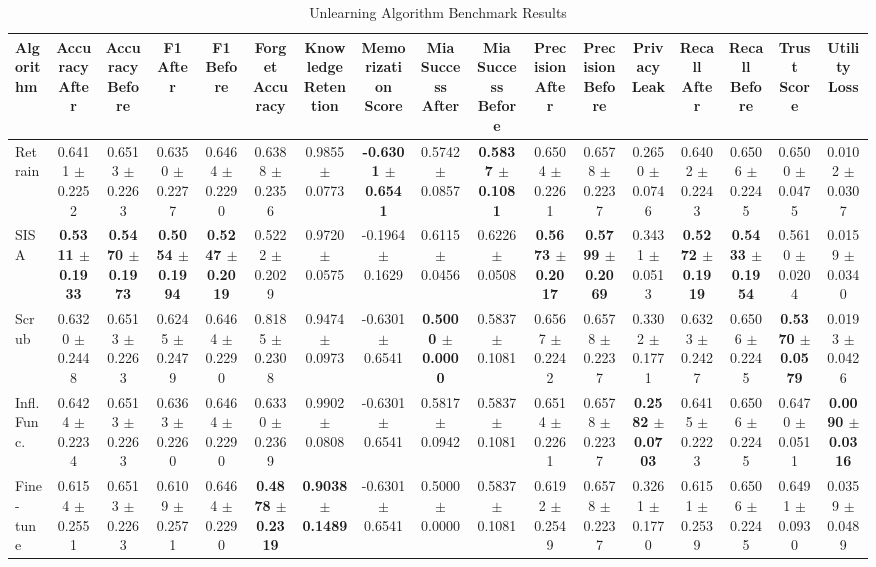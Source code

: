 \begin{table}[t]
\centering
\caption{Unlearning Algorithm Benchmark Results}
\label{tab:benchmark}
\small
\begin{tabular}{lcccccccccccccccc}
\toprule
Algorithm & Accuracy After & Accuracy Before & F1 After & F1 Before & Forget Accuracy & Knowledge Retention & Memorization Score & Mia Success After & Mia Success Before & Precision After & Precision Before & Privacy Leak & Recall After & Recall Before & Trust Score & Utility Loss \\
\midrule
Retrain & 0.6411 $\pm$ 0.2252 & 0.6513 $\pm$ 0.2263 & 0.6350 $\pm$ 0.2277 & 0.6464 $\pm$ 0.2290 & 0.6388 $\pm$ 0.2356 & 0.9855 $\pm$ 0.0773 & \textbf{-0.6301 $\pm$ 0.6541} & 0.5742 $\pm$ 0.0857 & \textbf{0.5837 $\pm$ 0.1081} & 0.6504 $\pm$ 0.2261 & 0.6578 $\pm$ 0.2237 & 0.2650 $\pm$ 0.0746 & 0.6402 $\pm$ 0.2243 & 0.6506 $\pm$ 0.2245 & 0.6500 $\pm$ 0.0475 & 0.0102 $\pm$ 0.0307 \\
SISA & \textbf{0.5311 $\pm$ 0.1933} & \textbf{0.5470 $\pm$ 0.1973} & \textbf{0.5054 $\pm$ 0.1994} & \textbf{0.5247 $\pm$ 0.2019} & 0.5222 $\pm$ 0.2029 & 0.9720 $\pm$ 0.0575 & -0.1964 $\pm$ 0.1629 & 0.6115 $\pm$ 0.0456 & 0.6226 $\pm$ 0.0508 & \textbf{0.5673 $\pm$ 0.2017} & \textbf{0.5799 $\pm$ 0.2069} & 0.3431 $\pm$ 0.0513 & \textbf{0.5272 $\pm$ 0.1919} & \textbf{0.5433 $\pm$ 0.1954} & 0.5610 $\pm$ 0.0204 & 0.0159 $\pm$ 0.0340 \\
Scrub & 0.6320 $\pm$ 0.2448 & 0.6513 $\pm$ 0.2263 & 0.6245 $\pm$ 0.2479 & 0.6464 $\pm$ 0.2290 & 0.8185 $\pm$ 0.2308 & 0.9474 $\pm$ 0.0973 & -0.6301 $\pm$ 0.6541 & \textbf{0.5000 $\pm$ 0.0000} & 0.5837 $\pm$ 0.1081 & 0.6567 $\pm$ 0.2242 & 0.6578 $\pm$ 0.2237 & 0.3302 $\pm$ 0.1771 & 0.6323 $\pm$ 0.2427 & 0.6506 $\pm$ 0.2245 & \textbf{0.5370 $\pm$ 0.0579} & 0.0193 $\pm$ 0.0426 \\
Infl. Func. & 0.6424 $\pm$ 0.2234 & 0.6513 $\pm$ 0.2263 & 0.6363 $\pm$ 0.2260 & 0.6464 $\pm$ 0.2290 & 0.6330 $\pm$ 0.2369 & 0.9902 $\pm$ 0.0808 & -0.6301 $\pm$ 0.6541 & 0.5817 $\pm$ 0.0942 & 0.5837 $\pm$ 0.1081 & 0.6514 $\pm$ 0.2261 & 0.6578 $\pm$ 0.2237 & \textbf{0.2582 $\pm$ 0.0703} & 0.6415 $\pm$ 0.2223 & 0.6506 $\pm$ 0.2245 & 0.6470 $\pm$ 0.0511 & \textbf{0.0090 $\pm$ 0.0316} \\
Fine-tune & 0.6154 $\pm$ 0.2551 & 0.6513 $\pm$ 0.2263 & 0.6109 $\pm$ 0.2571 & 0.6464 $\pm$ 0.2290 & \textbf{0.4878 $\pm$ 0.2319} & \textbf{0.9038 $\pm$ 0.1489} & -0.6301 $\pm$ 0.6541 & 0.5000 $\pm$ 0.0000 & 0.5837 $\pm$ 0.1081 & 0.6192 $\pm$ 0.2549 & 0.6578 $\pm$ 0.2237 & 0.3261 $\pm$ 0.1770 & 0.6151 $\pm$ 0.2539 & 0.6506 $\pm$ 0.2245 & 0.6491 $\pm$ 0.0930 & 0.0359 $\pm$ 0.0489 \\
\bottomrule
\end{tabular}
\end{table}
